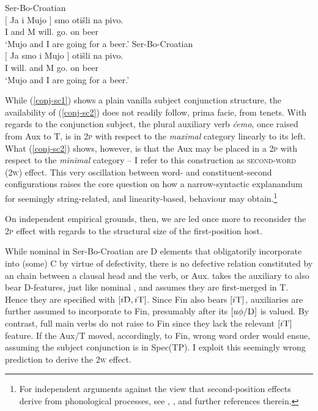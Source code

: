 \documentclass[output=paper]{langsci/langscibook}
\begin{document}
\begin{exe}
	\ex Ser-Bo-Croatian\\
    \gll $\big[$ Ja i Mujo $\big]$ smo otišli na pivo.\\
    {} I and M {} will.\Pl{} go.\Ptcp{} on beer \\
	\trans `Mujo and I are going for a beer.'
	\label{conj-sc1}
	\ex Ser-Bo-Croatian\\
	\gll $\big[$ Ja smo i Mujo $\big]$  otišli na pivo.\\
    {} I will.\Pl{} and M {} go.\Ptcp{} on beer \\
	\trans `Mujo and I are going for a beer.'
	\label{conj-sc2}
\end{exe}

While (\ref{conj-sc1}) shows a plain vanilla subject conjunction structure, the
availability of (\ref{conj-sc2}) does not readily follow, prima facie,
from  tenets.  With regards to the conjunction
subject, the plural auxiliary verb \emph{ćemo}, once raised from
Aux to T, is in \textsc{2p} with
respect to the \emph{maximal} category linearly to its left. What
(\ref{conj-sc2}) shows, however, is that the Aux may be placed in a \textsc{2p}
with respect to the \emph{minimal} category -- I refer to this construction
as \textsc{second-word} (\textsc{2w}) effect. This very oscillation between word- and
constituent-second configurations raises the core question on how a
narrow-syntactic explanandum for seemingly string-related, and linearity-based,
behaviour may obtain.\footnote{For independent arguments against the view that
second-position effects derive from phonological processes, see \citet[11--36,
75--93]{Boskovic:2001b}, \citet[Ch. 3]{Roberts2010}, and further references
therein.}

On independent empirical grounds, then, we are led once more to reconsider the
\textsc{2p} effect with regards to the structural size of the
first-po\-si\-tion host.

While nominal  in Ser-Bo-Croatian are
D elements that obligatorily incorporate into (some)
C by virtue of defectivity, there is no defective relation
constituted by an  chain between a clausal head and the verb, or Aux.
\citet[391]{roberts:2012uq} takes the auxiliary  to also bear
D-features, just like nominal , and assumes they are first-merged in
T. Hence they are specified with
$[i\textsc{D},i\textsc{T}]$. Since Fin also bears $[i\textsc{T}]$, auxiliaries
are further assumed to incorporate to Fin, presumably
after its $[u\phi/\textsc{D}]$ is valued. By contrast, full main verbs do not
raise to Fin since they lack the relevant $[i\textsc{T}]$ feature. If the Aux/T
moved, accordingly, to Fin, wrong word order would ensue, assuming the subject
conjunction is in Spec(TP). I exploit this seemingly wrong prediction
to derive the \textsc{2w} effect.
\end{document}
